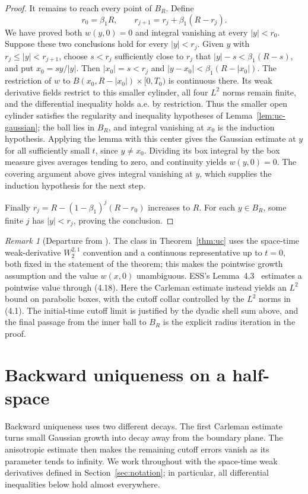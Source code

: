 \documentclass[11pt,letterpaper]{article}
\numberwithin{equation}{section}
\theoremstyle{plain}
\theoremstyle{definition}
\theoremstyle{remark}
\newtheorem{remark}[theorem]{Remark}
\begin{document}
\begin{proof}
It remains to reach every point of $B_R$. Define
\[
 r_0=\beta_1R,\qquad r_{j+1}=r_j+\beta_1(R-r_j).
\]
We have proved both $w(y,0)=0$ and integral vanishing at every
$|y|<r_0$. Suppose these two conclusions hold for every $|y|<r_j$.
Given $y$ with $r_j\leq|y|<r_{j+1}$, choose $s<r_j$ sufficiently close
to $r_j$ that $|y|-s<\beta_1(R-s)$, and put
$x_0=s y/|y|$. Then $|x_0|=s<r_j$ and
$|y-x_0|<\beta_1(R-|x_0|)$. The restriction of $w$ to
$B(x_0,R-|x_0|)\times[0,T_0)$ is continuous there. Its weak derivative
fields restrict to this smaller cylinder, all four $L^2$ norms remain finite,
and the differential inequality holds a.e. by restriction. Thus the smaller
open cylinder satisfies the regularity and inequality hypotheses of
Lemma~\ref{lem:uc-gaussian}; the ball lies in $B_R$, and integral vanishing
at $x_0$ is the induction hypothesis.
Applying the lemma with this center gives the Gaussian estimate at $y$ for
all sufficiently small $t$, since $y\ne x_0$. Dividing its box integral by
the box measure gives averages tending to zero, and continuity yields
$w(y,0)=0$. The covering argument above gives integral vanishing at $y$,
which supplies the induction hypothesis for the next step.

Finally $r_j=R-(1-\beta_1)^j(R-r_0)$ increases to $R$. For each
$y\in B_R$, some finite $j$ has $|y|<r_j$, proving the conclusion.
\end{proof}

\begin{remark}[Departure from \cite{ESS2003}]
The class in Theorem~\ref{thm:uc} uses the space-time weak-derivative
$W^{2,1}_2$ convention and a continuous representative up to $t=0$, both fixed
in the statement of the theorem; this makes the pointwise growth assumption and
the value $w(x,0)$ unambiguous. ESS's Lemma~4.3~\cite[pp.~230--233]{ESS2003} estimates a pointwise value
through (4.18). Here the Carleman estimate instead yields an $L^2$ bound on
parabolic boxes, with the cutoff collar controlled by the $L^2$ norms in
(4.1). The initial-time cutoff limit is justified by the dyadic shell sum
above, and the final passage from the inner ball to $B_R$ is the explicit
radius iteration in the proof.
\end{remark}

\section{Backward uniqueness on a half-space}\label{sec:bu}

Backward uniqueness uses two different decays. The first Carleman estimate turns
small Gaussian growth into decay away from the boundary plane. The anisotropic
estimate then makes the remaining cutoff errors vanish as its parameter tends
to infinity. We work throughout with the space-time weak derivatives defined
in Section~\ref{sec:notation}; in particular, all differential inequalities
below hold almost everywhere.
\end{document}
